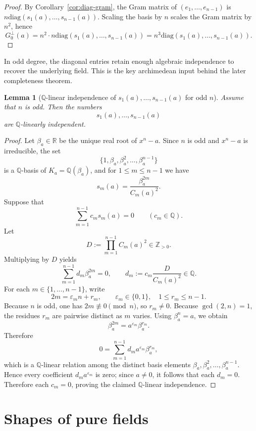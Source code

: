 \documentclass[11pt,letterpaper]{amsart}
\newcommand{\Q}{\mathbb{Q}}
\newcommand{\Z}{\mathbb{Z}}
\newcommand{\R}{\mathbb{R}}
\newcommand{\diag}{\mathrm{diag}}
\theoremstyle{plain}
\newtheorem{lemma}[theorem]{Lemma}
\theoremstyle{definition}
\begin{document}
\begin{proof}
By Corollary~\ref{cor:diag-gram}, the Gram matrix of $(e_1,\dots,e_{n-1})$ is
$n\diag(s_1(a),\dots,s_{n-1}(a))$.
Scaling the basis by $n$ scales the Gram matrix by $n^2$, hence
\[
G_0^\perp(a)=n^2\cdot n\diag(s_1(a),\dots,s_{n-1}(a))
=n^3\diag(s_1(a),\dots,s_{n-1}(a)).
\]
\end{proof}

In odd degree, the diagonal entries retain enough algebraic independence to recover the underlying field. This is the key archimedean input behind the later completeness theorem.

\begin{lemma}[$\Q$-linear independence of $s_1(a),\dots,s_{n-1}(a)$ for odd $n$]
\label{lem:odd-s-independence}
Assume that $n$ is odd.
Then the numbers
\[
s_1(a),\dots,s_{n-1}(a)
\]
are $\Q$-linearly independent.
\end{lemma}

\begin{proof}
Let $\beta_a\in \R$ be the unique real root of $x^n-a$.
Since $n$ is odd and $x^n-a$ is irreducible, the set
\[
\{1,\beta_a,\beta_a^2,\dots,\beta_a^{n-1}\}
\]
is a $\Q$-basis of $K_a=\Q(\beta_a)$, and for $1\le m\le n-1$ we have
\[
s_m(a)=\frac{\beta_a^{2m}}{C_m(a)^2}.
\]
Suppose that
\[
\sum_{m=1}^{n-1} c_m s_m(a)=0
\qquad(c_m\in \Q).
\]
Let
\[
D:=\prod_{m=1}^{n-1} C_m(a)^2\in \Z_{>0}.
\]
Multiplying by $D$ yields
\[
\sum_{m=1}^{n-1} d_m\beta_a^{2m}=0,
\qquad d_m:=c_m\frac{D}{C_m(a)^2}\in \Q.
\]
For each $m\in\{1,\dots,n-1\}$, write
\[
2m=\varepsilon_m n+r_m,
\qquad \varepsilon_m\in\{0,1\},\quad 1\le r_m\le n-1.
\]
Because $n$ is odd, one has $2m\not\equiv 0\pmod n$, so $r_m\neq 0$.
Because $\gcd(2,n)=1$, the residues $r_m$ are pairwise distinct as $m$ varies.
Using $\beta_a^n=a$, we obtain
\[
\beta_a^{2m}=a^{\varepsilon_m}\beta_a^{r_m}.
\]
Therefore
\[
0=\sum_{m=1}^{n-1} d_m a^{\varepsilon_m}\beta_a^{r_m},
\]
which is a $\Q$-linear relation among the distinct basis elements
$\beta_a,\beta_a^2,\dots,\beta_a^{n-1}$.
Hence every coefficient $d_m a^{\varepsilon_m}$ is zero; since $a\neq 0$, it follows that each $d_m=0$.
Therefore each $c_m=0$, proving the claimed $\Q$-linear independence.
\end{proof}


\section{Shapes of pure fields}\label{sec:shapes-pure-fields}
\end{document}

